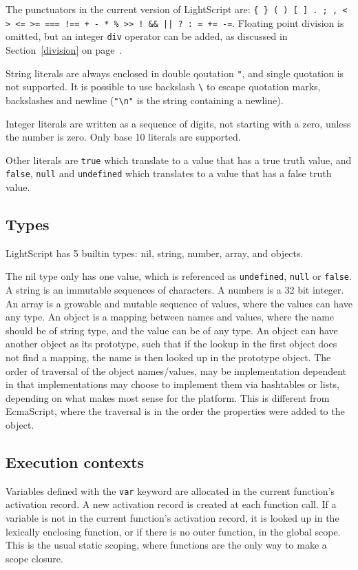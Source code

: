 \documentclass[11pt]{report}
\begin{document}
The punctuators in the current version of LightScript are: {\tt \verb|{| \verb|}| ( ) [ ] . ; , < > <= >= === !== + - * \% >> ! \&\& || ? : = += -=}. 
Floating point division is omitted, but an integer \verb|div| operator can be added, as discussed in Section~\ref{division} on page~\pageref{division}.

String literals are always enclosed in double qoutation \verb|"|, and single quotation is not supported. It is possible to use backslash \verb|\| to escape quotation marks, backslashes and newline (\verb|"\n"| is the string containing a newline).

Integer literals are written as a sequence of digits, not starting with a zero, unless the number is zero. Only base 10 literals are supported.

Other literals are \verb|true| which translate to a value that has a true truth value, and \verb|false|, \verb|null| and \verb|undefined| which translates to a value that has a false truth value.

\subsection{Types}
LightScript has 5 builtin types: nil, string, number, array, and objects.

The nil type only has one value, which is referenced as \verb|undefined|, \verb|null| or \verb|false|. 
A string is an immutable sequences of characters.
A numbers is a 32 bit integer.
An array is a growable and mutable sequence of values, where the values can have any type.
An object is a mapping between names and values, where the name should be of string type, and the value can be of any type. An object can have another object as its prototype, such that if the lookup in the first object does not find a mapping, the name is then looked up in the prototype object.
The order of traversal of the object names/values, may be implementation dependent in that implementations may choose to implement them via hashtables or lists, depending on what makes most sense for the platform. This is different from EcmaScript, where the traversal is in the order the properties were added to the object.

\subsection{Execution contexts}

Variables defined with the \verb|var| keyword are allocated in the current function's activation record. 
A new activation record is created at each function call. 
If a variable is not in the current function's activation record,
it is looked up in the lexically enclosing function, or if there is no outer function, in the global scope.
This is the usual static scoping, where functions are the only way to make a scope closure.
\end{document}
